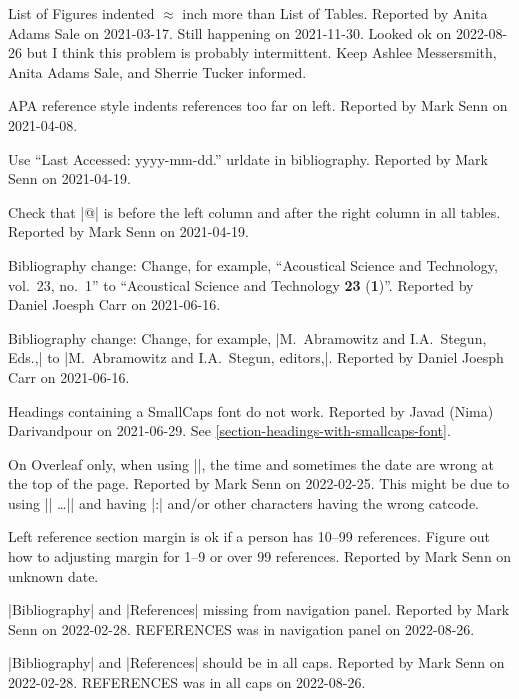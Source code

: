 List of Figures indented $\approx$ inch
more than List of Tables.
{\small
  Reported by Anita Adams Sale on 2021-03-17.
  Still happening on 2021-11-30.
  Looked ok on 2022-08-26
  but I think this problem is probably intermittent.
  Keep Ashlee Messersmith,
  Anita Adams Sale,
  and Sherrie Tucker informed.%
}

APA reference style indents references too far on left.
{\small
Reported by Mark Senn on 2021-04-08.%
}

Use ``Last Accessed: yyyy-mm-dd.'' urldate in bibliography.
{\small
  Reported by Mark Senn on 2021-04-19.%
}

Check that |@{}| is before the left column
and after the right column in all tables.
{\small
  Reported by Mark Senn on 2021-04-19.%
}

Bibliography change:
Change,
for example,
``Acoustical Science and Technology, vol.~23, no.~1''
to
``Acoustical Science and Technology {\bfseries 23\/} ({\bfseries 1\/})''.
{\small
  Reported by Daniel Joesph Carr on 2021-06-16.%
}

Bibliography change:
Change,
for example,
|M.~Abramowitz and I.A.~Stegun, Eds.,|
to
|M.~Abramowitz and I.A.~Stegun, editors,|.
{\small
  Reported by Daniel Joesph Carr on 2021-06-16.
}

Headings containing a SmallCaps font do not work.
{\small
  Reported by Javad (Nima) Darivandpour on 2021-06-29.
  See \ref{section-headings-with-smallcaps-font}.%
}

On Overleaf only,
when using
|\def\ZZshowtimestamp{true}|,
the time and sometimes the date
are wrong at the top of the page.
{\small
  Reported by Mark Senn on 2022-02-25.
  This might be due to using
  |\ExplSyntaxOn| \ldots |\ExplSyntaxOff|
  and having |:| and/or other characters having the wrong catcode.
}

Left reference section margin is ok if a person has 10--99 references.
{\small
  Figure out how to adjusting margin for 1--9 or over 99 references.
  Reported by Mark Senn on unknown date.
}

|Bibliography| and |References| missing from navigation panel.
{\small
  Reported by Mark Senn on 2022-02-28.
  REFERENCES was in navigation panel on 2022-08-26.
}

|Bibliography| and |References| should be in all caps.
{\small
  Reported by Mark Senn on 2022-02-28.
  REFERENCES was in all caps on 2022-08-26.%
}

